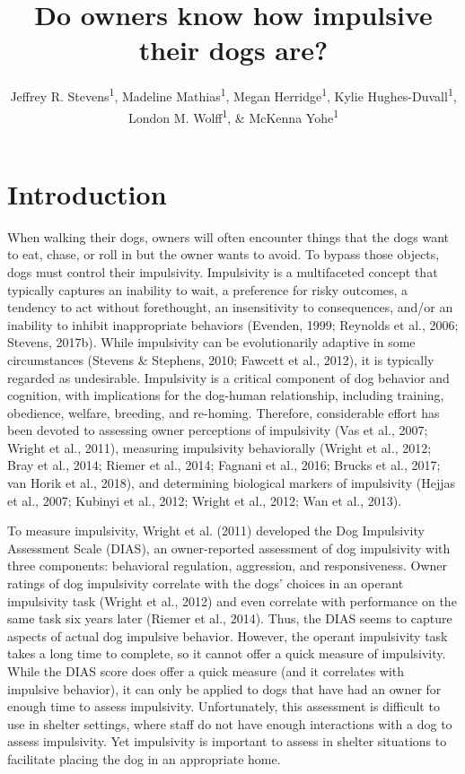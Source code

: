 \documentclass[
  pub,floatsintext]{apa6}
\title{Do owners know how impulsive their dogs are?}
\author{Jeffrey R. Stevens\textsuperscript{1}, Madeline Mathias\textsuperscript{1}, Megan Herridge\textsuperscript{1}, Kylie Hughes-Duvall\textsuperscript{1}, London M. Wolff\textsuperscript{1}, \& McKenna Yohe\textsuperscript{1}}
\date{}
\affiliation{\vspace{0.5cm}\textsuperscript{1} University of Nebraska-Lincoln}
\begin{document}
\maketitle

\hypertarget{introduction}{%
\section{Introduction}\label{introduction}}

When walking their dogs, owners will often encounter things that the dogs want to eat, chase, or roll in but the owner wants to avoid. To bypass those objects, dogs must control their impulsivity. Impulsivity is a multifaceted concept that typically captures an inability to wait, a preference for risky outcomes, a tendency to act without forethought, an insensitivity to consequences, and/or an inability to inhibit inappropriate behaviors (Evenden, 1999; Reynolds et al., 2006; Stevens, 2017b). While impulsivity can be evolutionarily adaptive in some circumstances (Stevens \& Stephens, 2010; Fawcett et al., 2012), it is typically regarded as undesirable. Impulsivity is a critical component of dog behavior and cognition, with implications for the dog-human relationship, including training, obedience, welfare, breeding, and re-homing. Therefore, considerable effort has been devoted to assessing owner perceptions of impulsivity (Vas et al., 2007; Wright et al., 2011), measuring impulsivity behaviorally (Wright et al., 2012; Bray et al., 2014; Riemer et al., 2014; Fagnani et al., 2016; Brucks et al., 2017; van Horik et al., 2018), and determining biological markers of impulsivity (Hejjas et al., 2007; Kubinyi et al., 2012; Wright et al., 2012; Wan et al., 2013).

To measure impulsivity, Wright et al. (2011) developed the Dog Impulsivity Assessment Scale (DIAS), an owner-reported assessment of dog impulsivity with three components: behavioral regulation, aggression, and responsiveness. Owner ratings of dog impulsivity correlate with the dogs' choices in an operant impulsivity task (Wright et al., 2012) and even correlate with performance on the same task six years later (Riemer et al., 2014). Thus, the DIAS seems to capture aspects of actual dog impulsive behavior. However, the operant impulsivity task takes a long time to complete, so it cannot offer a quick measure of impulsivity. While the DIAS score does offer a quick measure (and it correlates with impulsive behavior), it can only be applied to dogs that have had an owner for enough time to assess impulsivity. Unfortunately, this assessment is difficult to use in shelter settings, where staff do not have enough interactions with a dog to assess impulsivity. Yet impulsivity is important to assess in shelter situations to facilitate placing the dog in an appropriate home.
\end{document}

